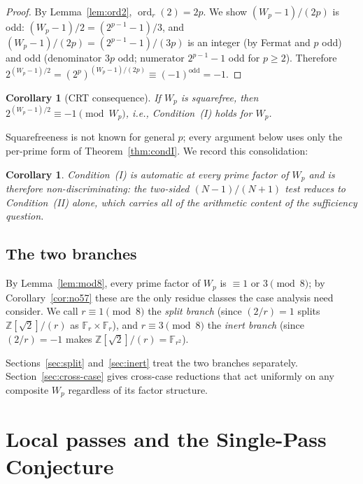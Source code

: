 \documentclass[11pt]{amsart}
\theoremstyle{plain}
\newtheorem{corollary}[theorem]{Corollary}
\theoremstyle{definition}
\theoremstyle{remark}
\numberwithin{equation}{section}
\newcommand{\ord}{\operatorname{ord}}
\newcommand{\Z}{\mathbb{Z}}
\newcommand{\F}{\mathbb{F}}
\begin{document}
\begin{proof}
By Lemma~\ref{lem:ord2}, $\ord_r(2) = 2p$. We show $(W_p - 1)/(2p)$ is odd: $(W_p - 1)/2 = (2^{p-1} - 1)/3$, and $(W_p - 1)/(2p) = (2^{p-1} - 1)/(3 p)$ is an integer (by Fermat and $p$ odd) and odd (denominator $3p$ odd; numerator $2^{p-1} - 1$ odd for $p \geq 2$). Therefore $2^{(W_p - 1)/2} = (2^p)^{(W_p - 1)/(2p)} \equiv (-1)^{\text{odd}} = -1$.
\end{proof}

\begin{corollary}[CRT consequence]\label{cor:condI-crt}
If $W_p$ is squarefree, then $2^{(W_p - 1)/2} \equiv -1 \pmod{W_p}$, i.e., Condition~(I) holds for $W_p$.
\end{corollary}

Squarefreeness is not known for general $p$; every argument below uses only the per-prime form of Theorem~\ref{thm:condI}. We record this consolidation:

\begin{corollary}\label{cor:condI-equiv}
Condition~(I) is automatic at every prime factor of $W_p$ and is therefore non-discriminating: the two-sided $(N-1)/(N+1)$ test reduces to Condition~(II) alone, which carries all of the arithmetic content of the sufficiency question.
\end{corollary}

\subsection{The two branches}

By Lemma~\ref{lem:mod8}, every prime factor of $W_p$ is $\equiv 1$ or $3 \pmod 8$; by Corollary~\ref{cor:no57} these are the only residue classes the case analysis need consider. We call $r \equiv 1 \pmod 8$ the \emph{split branch} (since $(2/r) = 1$ splits $\Z[\sqrt 2]/(r)$ as $\F_r \times \F_r$), and $r \equiv 3 \pmod 8$ the \emph{inert branch} (since $(2/r) = -1$ makes $\Z[\sqrt 2]/(r) = \F_{r^2}$).

Sections~\ref{sec:split} and~\ref{sec:inert} treat the two branches separately. Section~\ref{sec:cross-case} gives cross-case reductions that act uniformly on any composite $W_p$ regardless of its factor structure.

\section{Local passes and the Single-Pass Conjecture}\label{sec:spc}
\end{document}
